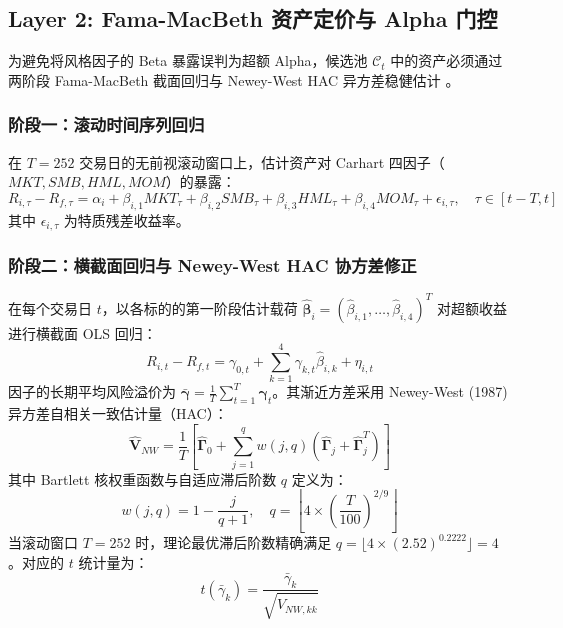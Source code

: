 \documentclass[11pt,a4paper]{article}
\begin{document}
\subsection{Layer 2: Fama-MacBeth 资产定价与 Alpha 门控}

为避免将风格因子的 Beta 暴露误判为超额 Alpha，候选池 $\mathcal{C}_t$ 中的资产必须通过两阶段 Fama-MacBeth 截面回归与 Newey-West HAC 异方差稳健估计 \cite{fama1973risk,newey1987simple}。

\subsubsection{阶段一：滚动时间序列回归}
在 $T = 252$ 交易日的无前视滚动窗口上，估计资产对 Carhart 四因子（$MKT, SMB, HML, MOM$）的暴露：
\begin{equation}
R_{i,\tau} - R_{f,\tau} = \alpha_i + \beta_{i,1}MKT_\tau + \beta_{i,2}SMB_\tau + \beta_{i,3}HML_\tau + \beta_{i,4}MOM_\tau + \epsilon_{i,\tau}, \quad \tau \in [t-T, t]
\end{equation}
其中 $\epsilon_{i,\tau}$ 为特质残差收益率。

\subsubsection{阶段二：横截面回归与 Newey-West HAC 协方差修正}
在每个交易日 $t$，以各标的的第一阶段估计载荷 $\hat{\boldsymbol{\beta}}_i = (\hat{\beta}_{i,1}, \dots, \hat{\beta}_{i,4})^T$ 对超额收益进行横截面 OLS 回归：
\begin{equation}
R_{i,t} - R_{f,t} = \gamma_{0,t} + \sum_{k=1}^4 \gamma_{k,t}\hat{\beta}_{i,k} + \eta_{i,t}
\end{equation}
因子的长期平均风险溢价为 $\bar{\boldsymbol{\gamma}} = \frac{1}{T}\sum_{t=1}^T \boldsymbol{\gamma}_t$。其渐近方差采用 Newey-West (1987) 异方差自相关一致估计量（HAC）：
\begin{equation}
\hat{\mathbf{V}}_{NW} = \frac{1}{T}\left[ \hat{\mathbf{\Gamma}}_0 + \sum_{j=1}^q w(j, q) \left(\hat{\mathbf{\Gamma}}_j + \hat{\mathbf{\Gamma}}_j^T\right) \right]
\end{equation}
其中 Bartlett 核权重函数与自适应滞后阶数 $q$ 定义为：
\begin{equation}
w(j, q) = 1 - \frac{j}{q + 1}, \quad q = \left\lfloor 4 \times \left(\frac{T}{100}\right)^{2/9} \right\rfloor
\end{equation}
当滚动窗口 $T = 252$ 时，理论最优滞后阶数精确满足 $q = \lfloor 4 \times (2.52)^{0.2222} \rfloor = 4$。对应的 $t$ 统计量为：
\begin{equation}
t(\bar{\gamma}_k) = \frac{\bar{\gamma}_k}{\sqrt{\hat{V}_{NW, kk}}}
\end{equation}
\end{document}
